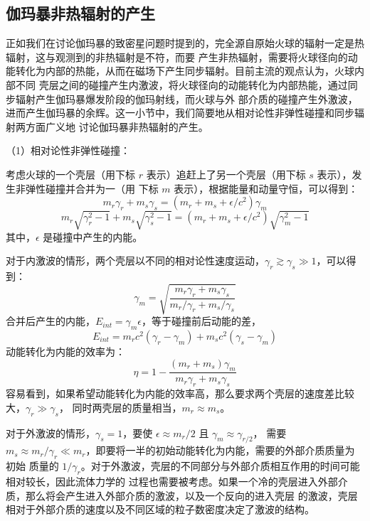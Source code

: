 	\subsection{伽玛暴非热辐射的产生}

	正如我们在讨论伽玛暴的致密星问题时提到的，完全源自原始火球的辐射一定是热辐射，这与观测到的非热辐射是不符，而要
	产生非热辐射，需要将火球径向的动能转化为内部的热能，从而在磁场下产生同步辐射。目前主流的观点认为，火球内部不同
	壳层之间的碰撞产生内激波，将火球径向的动能转化为内部热能，通过同步辐射产生伽玛暴爆发阶段的伽玛射线，而火球与外
	部介质的碰撞产生外激波，进而产生伽玛暴的余辉。这一小节中，我们简要地从相对论性非弹性碰撞和同步辐射两方面广义地
	讨论伽玛暴非热辐射的产生。

	（1）相对论性非弹性碰撞：

	考虑火球的一个壳层（用下标 $r$ 表示）追赶上了另一个壳层（用下标 $s$ 表示），发生非弹性碰撞并合并为一（用
	下标 $m$ 表示），根据能量和动量守恒，可以得到：
	\begin{equation}
	m_{r}\gamma_{r}+m_{s}\gamma_{s}=(m_{r}+m_{s}+\epsilon/c^{2})\gamma_{m}
	\end{equation}
	\begin{equation}
	m_{r}\sqrt{\gamma^{2}_{r}-1}+m_{s}\sqrt{\gamma^{2}_{s}-1}=(m_{r}+m_{s}+\epsilon/c^{2})\sqrt{\gamma^{2}_{m}-1}
	\end{equation}
	其中，$\epsilon$ 是碰撞中产生的内能。

	对于内激波的情形，两个壳层以不同的相对论性速度运动，$\gamma_{r}\gtrsim\gamma_{s}\gg1$，可以得到：
	\begin{equation}
	\gamma_{m}=\sqrt{\frac{m_{r}\gamma_{r}+m_{s}\gamma_{s}}{m_{r}/\gamma_{r}+m_{s}/\gamma_{s}}}
	\end{equation}
	合并后产生的内能，$E_{int}=\gamma_{m}\epsilon$，等于碰撞前后动能的差，
	\begin{equation}
	E_{int}=m_{r}c^{2}(\gamma_{r}-\gamma_{m})+m_{s}c^{2}(\gamma_{s}-\gamma_{m})
	\end{equation}
	动能转化为内能的效率为：
	\begin{equation}
	\eta=1-\frac{(m_{r}+m_{s})\gamma_{m}}{m_{r}\gamma_{r}+m_{s}\gamma_{s}}
	\end{equation}
	容易看到，如果希望动能转化为内能的效率高，那么要求两个壳层的速度差比较大，$\gamma_{r}\gg\gamma_{s}$，
	同时两壳层的质量相当，$m_{r}\approx m_{s}$。

	对于外激波的情形，$\gamma_{s}=1$，要使 $\epsilon\approx m_{r}/2$ 且 $\gamma_{m}\approx\gamma_{r/2}$，
	需要 $m_{s}\approx m_{r}/\gamma_{r}\ll m_{r}$，即要将一半的初始动能转化为内能，需要的外部介质质量为初始
	质量的 $1/\gamma_{r}$。对于外激波，壳层的不同部分与外部介质相互作用的时间可能相对较长，因此流体力学的
	过程也需要被考虑。如果一个冷的壳层进入外部介质，那么将会产生进入外部介质的激波，以及一个反向的进入壳层
	的激波，壳层相对于外部介质的速度以及不同区域的粒子数密度决定了激波的结构。

